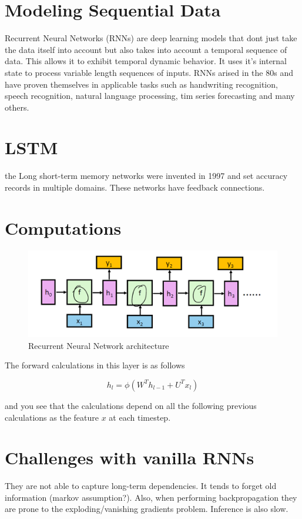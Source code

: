 \section{Modeling Sequential Data}
Recurrent Neural Networks (RNNs) are deep learning models that dont just take 
the data itself into account but also takes into account a temporal sequence
of data. This allows it to exhibit temporal dynamic behavior. It uses it's 
internal state to process variable length sequences of inputs. RNNs arised 
in the 80s and have proven themselves in applicable tasks such as handwriting
recognition, speech recognition, natural language processing, tim series 
forecasting and many others.

\section{LSTM}
the Long short-term memory networks were invented in 1997 and set accuracy
records in multiple domains. These networks have feedback connections.

\section{Computations}

\begin{figure}[H]
\centering
\includegraphics[scale=0.25]{figures/RNN.PNG}
\caption{Recurrent Neural Network architecture}
\end{figure}

The forward calculations in this layer is as follows

\begin{equation*}
    h_{l} = \phi(W^T h_{l-1} + U^T x_{l})
\end{equation*}

and you see that the calculations depend on all the following previous 
calculations as the feature $x$ at each timestep.

\section{Challenges with vanilla RNNs}
They are not able to capture long-term dependencies. It tends to forget old
information (markov assumption?). Also, when performing backpropagation they 
are prone to the exploding/vanishing gradients problem. Inference is also
slow.

